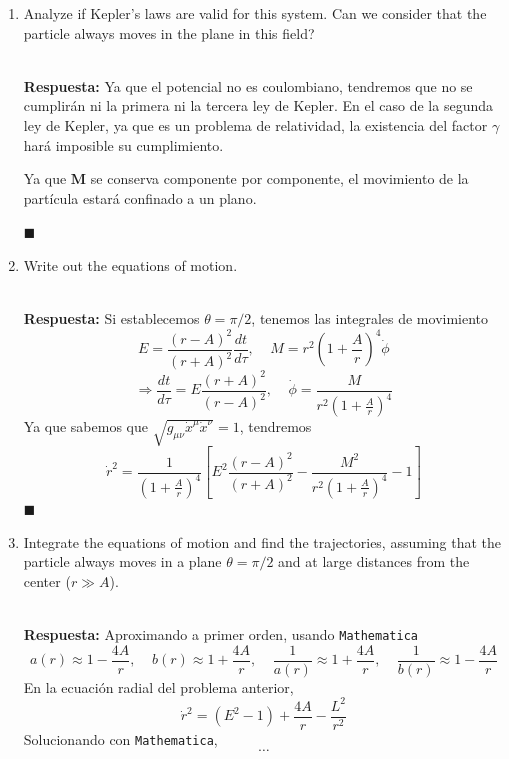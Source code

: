 \documentclass[]{article}
\numberwithin{equation}{section}
\newcommand{\0}{\textcolor{gray}{0}}
\newcommand{\td}[2]{\dfrac{d #1}{d #2}}
\newcommand{\n}[1]{\mathbf{#1}}
\newcommand{\qed}{\hfill\(\blacksquare\)}
\newcommand{\resp}{
	\\
	
	\textbf{Respuesta:} }
\begin{document}
\begin{enumerate}
	\item[(b)] Analyze if Kepler's laws are valid for this system. Can we consider that the particle always moves in the plane in this field?
	\resp Ya que el potencial no es coulombiano, tendremos que no se cumplirán ni la primera ni la tercera ley de Kepler. En el caso de la segunda ley de Kepler, ya que es un problema de relatividad, la existencia del factor $\gamma$ hará imposible su cumplimiento.
	
	Ya que $\n{M}$ se conserva componente por componente, el movimiento de la partícula estará confinado a un plano.
	
	\qed
	
	\item[(c)] Write out the equations of motion.
	\resp Si establecemos $\theta = \pi/2$, tenemos las integrales de movimiento
	\begin{equation*}
		E = \frac{(r - A)^2}{(r + A)^2} \td{t}{\tau}, ~~~~~ M =  r^2 \left(1 + \frac{A}{r}\right)^4 \dot{\phi}
	\end{equation*}
	\begin{equation*}
		\Rightarrow \td{t}{\tau} = E \frac{(r + A)^2}{(r - A)^2} , ~~~~~ \dot{\phi} =  \frac{M}{r^2 \left(1 + \frac{A}{r}\right)^4 }
	\end{equation*}
	Ya que sabemos que $\sqrt{g_{\mu\nu} \dot{x}^{\mu} \dot{x}^{\nu}} = 1$, tendremos
	\begin{equation}
		\dot{r}^2 = \frac{1}{\left(1 + \frac{A}{r}\right)^4} \left[E^2 \frac{{(r - A)^2}}{(r + A)^2} - \frac{M^2}{r^2 \left(1 + \frac{A}{r}\right)^4} - 1\right]
	\end{equation}
	\qed
	
	\item[(d)] Integrate the equations of motion and find the trajectories, assuming that the particle always moves in a plane $\theta = \pi/2$ and at large distances from the center ($r \gg A$).
	\resp Aproximando a primer orden, usando \texttt{Mathematica}
	\begin{equation*}
		a(r) \approx 1 - \frac{4A}{r}, ~~~~~ b(r) \approx 1 + \frac{4A}{r}, ~~~~~ \frac{1}{a(r)} \approx 1 + \frac{4A}{r}, ~~~~~ \frac{1}{b(r)} \approx 1 - \frac{4A}{r}
	\end{equation*}
	En la ecuación radial del problema anterior,
	\begin{equation*}
		\dot{r}^2 = (E^2 - 1) + \frac{4 A}{r} - \frac{L^2}{r^2}
	\end{equation*}
	Solucionando con \texttt{Mathematica},
	\begin{equation*}
		\ldots
	\end{equation*}
\end{enumerate}
\end{document}
